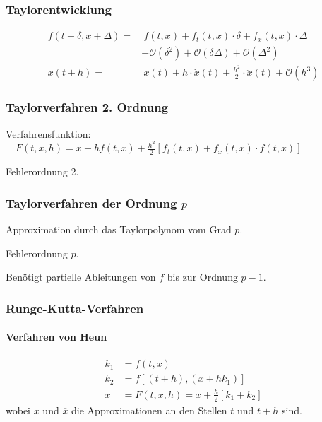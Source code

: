 		\subsubsection{Taylorentwicklung}
			\begin{align*}
				f(t+\delta , x + \Delta) =&\: f(t,x) + f_t (t,x)\cdot \delta + f_x (t,x)\cdot \Delta \\
				& + \mathcal{O}(\delta^2) + \mathcal{O}(\delta \Delta) + \mathcal{O}(\Delta^2) \\
				x(t+h) =&\: x(t) + h \cdot \dot x(t) + \frac{h^2}{2} \cdot \ddot x(t) + \mathcal{O}(h^3)
			\end{align*}

		\subsubsection{Taylorverfahren 2. Ordnung}
			Verfahrensfunktion: $\quad F(t,x,h)=x + hf(t,x) + \frac{h^2}{2}\left[ f_t(t,x) + f_x(t,x)\cdot f(t,x)\right]$

			Fehlerordnung 2.

		\subsubsection{Taylorverfahren der Ordnung $p$}
			\begin{tightitemize}
				\item Approximation durch das Taylorpolynom vom Grad $p$.
				\item Fehlerordnung $p$.
				\item Benötigt partielle Ableitungen von $f$ bis zur Ordnung $p-1$.
			\end{tightitemize}

		\subsubsection{Runge-Kutta-Verfahren}
			\paragraph{Verfahren von Heun}
				\label{heun}
				\begin{align*}
					k_1 &= f(t,x) \\
					k_2 &= f\left[(t+h),(x+hk_1)\right] \\
					\overline{x} &= F(t,x,h)=x + \frac{h}{2}\left[ k_1 + k_2\right]
				\end{align*}
				wobei $x$ und $\overline x$ die Approximationen an den Stellen $t$ und $t+h$ sind.

